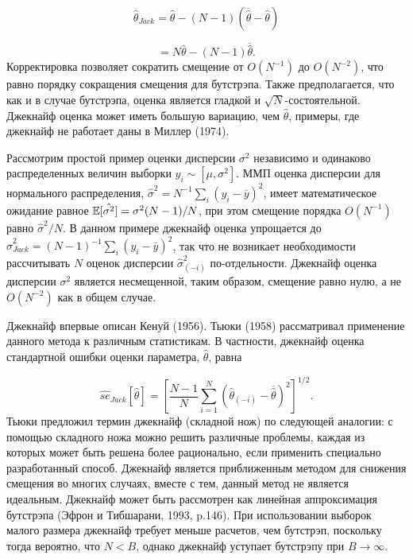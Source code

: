\begin{equation}
\hat{\theta}_{Jack}=\hat{\theta}-(N-1)(\overline{\hat{\theta}}-\hat{\theta})
\end{equation}

\[
=N\hat{\theta}-(N-1)\overline{\hat{\theta}}.
\]
Корректировка позволяет сократить смещение от $O(N^{-1})$ до $O(N^{-2})$, что равно порядку сокращения смещения для бутстрэпа. Также предполагается, что как и в случае бутстрэпа, оценка является  гладкой и $\sqrt{N}$-состоятельной. Джекнайф оценка может иметь большую вариацию, чем $\hat{\theta}$, примеры, где джекнайф не работает даны в Миллер (1974).

Рассмотрим простой пример оценки дисперсии $\sigma^2$ независимо и одинаково распределенных величин выборки $y_i \sim [\mu,\sigma^2]$. ММП оценка дисперсии для нормального распределения, $\hat{\sigma}^2=N^{-1} \sum_{i}(y_i-\overline{y})^2$, имеет математическое ожидание равное $\mathbb{E}[\hat{\sigma^2}]=\sigma^2(N-1)/N$, при этом смещение порядка  $O(N^{-1})$  равно $\hat{\sigma}^2/N$. В данном примере джекнайф оценка упрощается до $\hat{\sigma}^{2}_{Jack}=(N-1)^{-1}\sum_{i}(y_i-\overline{y})^2$, так что не возникает необходимости рассчитывать $N$ оценок дисперсии $\hat{\sigma}^{2}_{(-i)}$ по-отдельности. Джекнайф оценка дисперсии $\sigma^2$ является несмещенной, таким образом, смещение равно нулю, а не $O(N^{-2})$ как в общем случае.

Джекнайф впервые описан Кенуй (1956). Тьюки (1958) рассматривал применение данного метода к различным  статистикам. В частности, джекнайф оценка стандартной ошибки оценки параметра, $\hat{\theta}$, равна 

\begin{equation}
\hat{se}_{Jack}[\hat{\theta}]=\left[\dfrac{N-1}{N}\sum^{N}_{i=1}(\hat{\theta}_{(-i)}-\overline{\hat{\theta}})^2\right]^{1/2}.
\end{equation}
Тьюки предложил термин джекнайф (складной нож) по следующей аналогии: с помощью складного ножа можно  решить различные проблемы, каждая из которых может быть решена более рационально, если применить специально разработанный способ. Джекнайф является приближенным методом для снижения смещения во многих случаях, вместе с тем, данный метод не является идеальным. Джекнайф может быть рассмотрен как линейная аппроксимация бутстрэпа (Эфрон и Тибшарани, 1993, p.146). При использовании выборок малого размера джекнайф требует меньше расчетов, чем  бутстрэп, поскольку тогда вероятно, что $N<B$, однако джекнайф уступает бутстрэпу  при $B \rightarrow \infty$.

